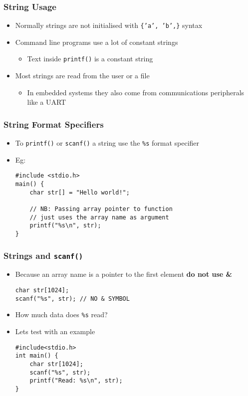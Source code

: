 \documentclass[14pt]{beamer}
\begin{document}
\begin{frame}
\frametitle{String Usage}
\begin{itemize}
\item Normally strings are not initialised with \texttt{\{'a', 'b',\}} syntax
\item Command line programs use a lot of constant strings
	\begin{itemize}
		\item Text inside \texttt{printf()} is a constant string
	\end{itemize}
\item Most strings are read from the user or a file
	\begin{itemize}
		\item In embedded systems they also come from communications peripherals like a UART
	\end{itemize}
\end{itemize}
\end{frame}

\begin{frame}[fragile]
\frametitle{String Format Specifiers}
\begin{itemize}
\item To \texttt{printf()} or \texttt{scanf()} a string use the \texttt{\%s} format specifier
\item Eg:
\begin{lstlisting}[style=CStyle]
#include <stdio.h>
main() {
	char str[] = "Hello world!";
	
	// NB: Passing array pointer to function
	// just uses the array name as argument
	printf("%s\n", str);
}
\end{lstlisting}
\end{itemize}
\end{frame}

\begin{frame}[fragile]
\frametitle{Strings and \texttt{scanf()}}
\begin{itemize}
\item Because an array name is a pointer to the first element \textbf{do not use \&}
\begin{lstlisting}[style=CStyle]
char str[1024];
scanf("%s", str); // NO & SYMBOL
\end{lstlisting}
\pause
\item How much data does \texttt{\%s} read?
\pause
\item Lets test with an example
\begin{lstlisting}[style=CStyle]
#include<stdio.h> 
int main() { 
    char str[1024]; 
    scanf("%s", str); 
    printf("Read: %s\n", str); 
}
\end{lstlisting}
\end{itemize}
\end{frame}
\end{document}
